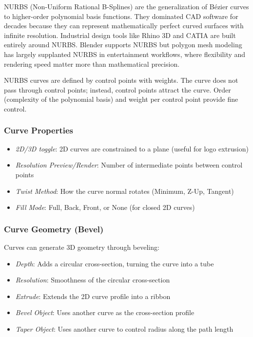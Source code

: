 \begin{historynote}
NURBS (Non-Uniform Rational B-Splines) are the generalization of B\'{e}zier curves to higher-order polynomial basis functions. They dominated CAD software for decades because they can represent mathematically perfect curved surfaces with infinite resolution. Industrial design tools like Rhino 3D and CATIA are built entirely around NURBS. Blender supports NURBS but polygon mesh modeling has largely supplanted NURBS in entertainment workflows, where flexibility and rendering speed matter more than mathematical precision.
\end{historynote}

NURBS curves are defined by control points with weights. The curve does not pass through control points; instead, control points attract the curve. Order (complexity of the polynomial basis) and weight per control point provide fine control.

\subsubsection{Curve Properties}

\begin{itemize}[leftmargin=2em]
  \item \textit{2D/3D toggle}: 2D curves are constrained to a plane (useful for logo extrusion)
  \item \textit{Resolution Preview/Render}: Number of intermediate points between control points
  \item \textit{Twist Method}: How the curve normal rotates (Minimum, Z-Up, Tangent)
  \item \textit{Fill Mode}: Full, Back, Front, or None (for closed 2D curves)
\end{itemize}

\subsubsection{Curve Geometry (Bevel)}

Curves can generate 3D geometry through beveling:
\begin{itemize}[leftmargin=2em]
  \item \textit{Depth}: Adds a circular cross-section, turning the curve into a tube
  \item \textit{Resolution}: Smoothness of the circular cross-section
  \item \textit{Extrude}: Extends the 2D curve profile into a ribbon
  \item \textit{Bevel Object}: Uses another curve as the cross-section profile
  \item \textit{Taper Object}: Uses another curve to control radius along the path length
\end{itemize}


